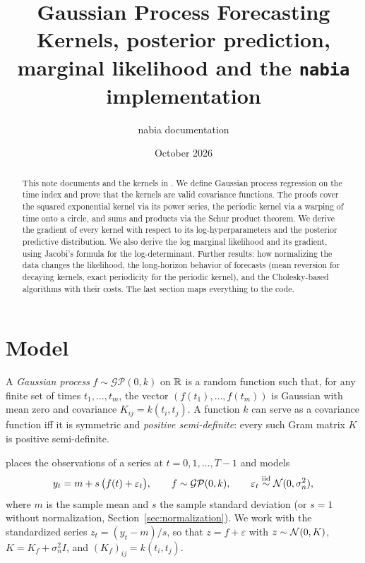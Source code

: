 \documentclass[11pt,a4paper]{article}
\title{Gaussian Process Forecasting\\[0.3em]\large Kernels, posterior prediction, marginal likelihood and the \texttt{nabia} implementation}
\author{nabia documentation}
\date{October 2026}
\begin{document}
\maketitle

\begin{abstract}
This note documents  and the kernels in .
We define Gaussian process regression on the time index and prove that the
 kernels are valid covariance functions. The proofs cover the squared exponential kernel via
its power series, the periodic kernel via a warping of time onto a circle, and sums and
products via the Schur product theorem. We derive the gradient of every kernel with
respect to its log-hyperparameters and the posterior predictive distribution.
We also derive the log marginal likelihood and its gradient, using Jacobi's formula for
the log-determinant. Further results: how normalizing the data changes the likelihood, the
long-horizon behavior of forecasts (mean reversion for decaying kernels,
exact periodicity for the periodic kernel), and the Cholesky-based algorithms
with their costs. The last section maps everything to the code.
\end{abstract}

\tableofcontents

\section{Model}

\begin{definition}
A \emph{Gaussian process} $f\sim\mathcal{GP}(0,k)$ on $\mathbb{R}$ is a random
function such that, for any finite set of times $t_1,\dots,t_m$, the vector
$(f(t_1),\dots,f(t_m))$ is Gaussian with mean zero and covariance
$K_{ij}=k(t_i,t_j)$. A function $k$ can serve as a covariance function iff it is
symmetric and \emph{positive semi-definite}: every such Gram matrix $K$ is positive
semi-definite.
\end{definition}

 places the observations of a series at $t=0,1,\dots,T-1$ and
models
\begin{equation}\label{eq:model}
  y_t = m + s\,\big(f(t) + \varepsilon_t\big),\qquad f\sim\mathcal{GP}(0,k),\qquad
  \varepsilon_t\overset{\text{iid}}{\sim}\mathcal{N}(0,\sigma_n^2),
\end{equation}
where $m$ is the sample mean and $s$ the sample standard deviation (or $s=1$
without normalization, Section~\ref{sec:normalization}). We work with the
standardized series $z_t=(y_t-m)/s$, so that $z = f + \varepsilon$ with
$z\sim\mathcal{N}(0,K)$, $K = K_f + \sigma_n^2 I$, and $(K_f)_{ij}=k(t_i,t_j)$.
\end{document}
